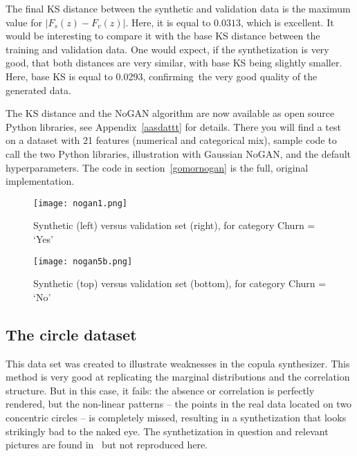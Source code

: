 \documentclass[oneside,10pt]{book}
\begin{document}
The final KS distance between the synthetic and validation data is the maximum value for 
$|F_s(z) - F_v(z)|$. Here, it is equal to $0.0313$, which is excellent. It would be interesting to compare it with the base KS distance
 between the training and validation data. One would expect, if the synthetization is very good, that both distances are very similar, with base KS
 being slightly smaller. Here, base KS is equal to 0.0293, confirming~the very good quality of the generated data.

The KS distance and the NoGAN algorithm are now available as open source Python libraries, see Appendix~\ref{aasdattt} for details. 
There you will find a test on a dataset with 21 features (numerical and categorical mix), sample code to call the two Python libraries, 
 illustration with Gaussian NoGAN, and the default hyperparameters.  The code
 in section~\ref{gomornogan} is the full, original implementation. 

\begin{figure}[H]
\centering
\texttt{[image: nogan1.png]} %
\caption{Synthetic (left) versus validation set (right), for category Churn = `Yes'}
\label{fig:nogan1}
\end{figure}




\begin{figure}[H]
\centering
\texttt{[image: nogan5b.png]} %
\caption{Synthetic (top) versus validation set (bottom), for category Churn = `No'}
\label{fig:nogan5}
\end{figure}







\subsection{The circle dataset}

This data set was created to illustrate weaknesses in the \textcolor{index}{copula synthesizer}. This method is very good at replicating
 the marginal distributions and the correlation structure. But in this case, it fails: the absence or correlation is perfectly rendered, but
 the non-linear patterns -- the points in the real data located on two concentric circles -- is completely missed, resulting in  a synthetization that looks strikingly bad to the naked eye. The synthetization in question and relevant pictures are found in~\cite{vgvendors} but not reproduced here.
\end{document}
